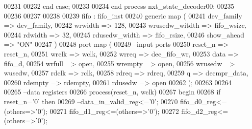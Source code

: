 \begin{DoxyCode}
00231 
00232         \textcolor{keywordflow}{end} \textcolor{keywordflow}{case};
00233         
00234     \textcolor{keywordflow}{end} \textcolor{keywordflow}{process} \textcolor{vhdlchar}{nxt\_state\_decoder00};
00235 
00236     
00237     
00238     
00239         fifo :  fifo_inst 
00240   \textcolor{keywordflow}{generic} \textcolor{keywordflow}{map} (
00241             dev_family      => dev_family, 
00242             wrwidth         => \textcolor{vhdllogic}{128}, 
00243             wrusedw_witdth  => fifo_wsize, 
00244             rdwidth         => \textcolor{vhdllogic}{32}, 
00245             rdusedw_width   => fifo_rsize,
00246             show_ahead      => \textcolor{keyword}{"ON"}
00247   \textcolor{vhdlchar}{)}  
00248   \textcolor{keywordflow}{port} \textcolor{keywordflow}{map} (
00249 \textcolor{keyword}{      --input ports }
00250       reset_n       => reset_n, 
00251       wrclk         => wclk,
00252       wrreq         => dec_fifo_wr,
00253       data          => fifo_d, 
00254       wrfull        => \textcolor{keywordflow}{open},
00255         wrempty       => \textcolor{keywordflow}{open}, 
00256       wrusedw       => wusedw,
00257       rdclk          => rclk,
00258       rdreq         => rdreq,
00259       q             => decmpr_data,
00260       rdempty       => rdempty,
00261       rdusedw       => \textcolor{keywordflow}{open}    
00262         \textcolor{vhdlchar}{)};
00263     
00264 
00265 \textcolor{keyword}{--data registers}
00266   \textcolor{keywordflow}{process}(reset_n, wclk)
00267 \textcolor{vhdlkeyword}{    begin}
00268       \textcolor{keywordflow}{if} \textcolor{vhdlchar}{reset_n}\textcolor{vhdlchar}{=}\textcolor{vhdlchar}{'}\textcolor{vhdllogic}{}\textcolor{vhdllogic}{0}\textcolor{vhdlchar}{'} \textcolor{keywordflow}{then}
00269 \textcolor{keyword}{        --data\_in\_valid\_reg<='0';}
00270           \textcolor{vhdlchar}{fifo_d0_reg}\textcolor{vhdlchar}{<=}\textcolor{vhdlchar}{(}\textcolor{keywordflow}{others}\textcolor{vhdlchar}{=}\textcolor{vhdlchar}{>}\textcolor{vhdlchar}{'}\textcolor{vhdllogic}{}\textcolor{vhdllogic}{0}\textcolor{vhdlchar}{'}\textcolor{vhdlchar}{)};
00271           \textcolor{vhdlchar}{fifo_d1_reg}\textcolor{vhdlchar}{<=}\textcolor{vhdlchar}{(}\textcolor{keywordflow}{others}\textcolor{vhdlchar}{=}\textcolor{vhdlchar}{>}\textcolor{vhdlchar}{'}\textcolor{vhdllogic}{}\textcolor{vhdllogic}{0}\textcolor{vhdlchar}{'}\textcolor{vhdlchar}{)};
00272           \textcolor{vhdlchar}{fifo_d2_reg}\textcolor{vhdlchar}{<=}\textcolor{vhdlchar}{(}\textcolor{keywordflow}{others}\textcolor{vhdlchar}{=}\textcolor{vhdlchar}{>}\textcolor{vhdlchar}{'}\textcolor{vhdllogic}{}\textcolor{vhdllogic}{0}\textcolor{vhdlchar}{'}\textcolor{vhdlchar}{)};

\end{DoxyCode}

